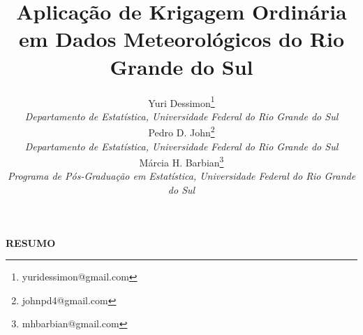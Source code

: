 \documentclass{2ssmeeting}
\begin{document}
\title{Aplicação de Krigagem Ordinária em Dados Meteorológicos do Rio Grande do Sul}


\author{
    {\large Yuri Dessimon}\thanks{yuridessimon@gmail.com}\\ 
    {\small \textit{Departamento de Estatística, Universidade Federal do Rio Grande do Sul}} \\
    {\large Pedro D. John}\thanks{johnpd4@gmail.com}\\
    {\small \textit{Departamento de Estatística, Universidade Federal do Rio Grande do Sul}}  \\
    {\large Márcia H. Barbian}\thanks{mhbarbian@gmail.com}\\
    {\small \textit{Programa de Pós-Graduação em Estatística, Universidade Federal do Rio Grande do Sul}}
}
\criartitulo


\vspace{1cm}

\textbf{RESUMO}

\vspace{0.1cm}
\end{document}
